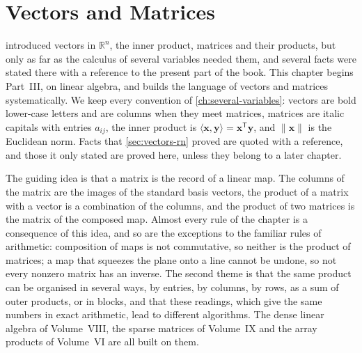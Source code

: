 \chapter{Vectors and Matrices}
\label{ch:vectors-matrices}


 introduced vectors in $\mathbb R^n$, the inner product, matrices and their products, but only as far as the calculus of several variables needed them, and several facts were stated there with a reference to the present part of the book. This chapter begins Part~III, on linear algebra, and builds the language of vectors and matrices systematically. We keep every convention of \cref{ch:several-variables}: vectors are bold lower-case letters and are columns when they meet matrices, matrices are italic capitals with entries $a_{ij}$, the inner product is $\langle\mathbf x,\mathbf y\rangle=\mathbf x^{\mathsf T}\mathbf y$, and $\|\mathbf x\|$ is the Euclidean norm. Facts that \cref{sec:vectors-rn} proved are quoted with a reference, and those it only stated are proved here, unless they belong to a later chapter.

The guiding idea is that a matrix is the record of a linear map. The columns of the matrix are the images of the standard basis vectors, the product of a matrix with a vector is a combination of the columns, and the product of two matrices is the matrix of the composed map. Almost every rule of the chapter is a consequence of this idea, and so are the exceptions to the familiar rules of arithmetic: composition of maps is not commutative, so neither is the product of matrices; a map that squeezes the plane onto a line cannot be undone, so not every nonzero matrix has an inverse. The second theme is that the same product can be organised in several ways, by entries, by columns, by rows, as a sum of outer products, or in blocks, and that these readings, which give the same numbers in exact arithmetic, lead to different algorithms. The dense linear algebra of Volume~VIII, the sparse matrices of Volume~IX and the array products of Volume~VI are all built on them.

